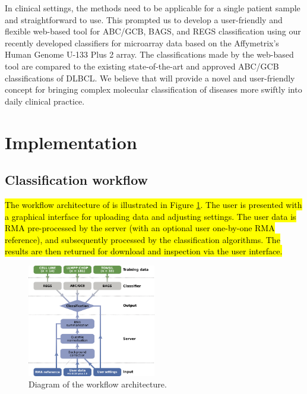 \documentclass{article}
\begin{document}
In clinical settings, the methods need to be applicable for a single patient sample and straightforward to use.
This prompted us to develop a user-friendly and flexible web-based tool for ABC/GCB, BAGS, and REGS classification using our recently developed classifiers for microarray data based on the Affymetrix's Human Genome U-133 Plus 2 array.
The classifications made by the web-based tool \hemaClass{} are compared to the existing state-of-the-art and approved ABC/GCB classifications of DLBCL.
We believe that \hemaClass{} will provide a novel and user-friendly concept for bringing complex molecular classification of diseases more swiftly into daily clinical practice.


\section{Implementation}
\subsection{Classification workflow}
\hl{
The workflow architecture of \hemaClass{} is illustrated in Figure \mbox{\ref{fig:webtooldiagram}}. The user is presented with a graphical interface for uploading data and adjusting settings. The user data is RMA pre-processed by the server (with an optional user one-by-one RMA reference), and subsequently processed by the classification algorithms. The results are then returned for download and inspection via the user interface.}

\begin{figure}
\begin{center}
\includegraphics[width=0.5\textwidth]{figures/figure1.pdf}
\end{center}
\caption{Diagram of the \hemaClass{} workflow architecture.}
\label{fig:webtooldiagram}
\end{figure}
\end{document}
